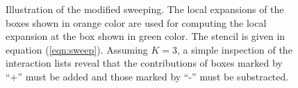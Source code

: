 \begin{figure}
\centering
{}
\caption{\small Illustration of the modified sweeping. The local expansions of the boxes shown in orange color are used for computing the local expansion at the box shown in green color. The stencil is given in equation (\ref{eqn:sweep}). Assuming $K = 3$, a simple inspection of the interaction lists reveal that the contributions of boxes marked by ``+'' must be added and those marked by ``-'' must be substracted. }
\label{fig:w2l}
\end{figure}

